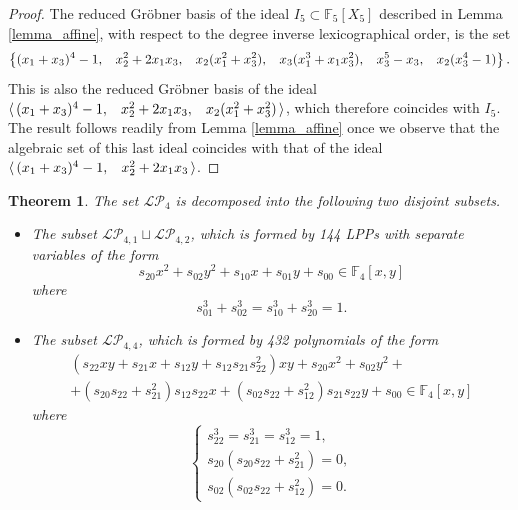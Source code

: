 \documentclass[pdflatex,sn-mathphys-num]{sn-jnl}
\theoremstyle{thmstyleone}%
\newtheorem{theorem}{Theorem}[section]
\begin{document}
\begin{proof} The reduced Gr\"obner basis of the ideal $I_5\subset \mathbb{F}_5[X_5]$ described in Lemma \ref{lemma_affine}, with respect to the degree inverse lexicographical order, is the set
\[\left\{(x_1+x_3)^4-1,\hspace{0.3cm}
x_2^2+2x_1x_3,\hspace{0.3cm}
x_2(x_1^2+x_3^2),\hspace{0.3cm}
x_3(x_1^3+x_1x_3^2),\hspace{0.3cm}
x_3^5-x_3,\hspace{0.3cm}
x_2(x_3^4-1)\right\}.\]
This is also the reduced Gr\"obner basis of the ideal $\langle\, (x_1+x_3)^4-1,\hspace{0.3cm}x_2^2+2x_1x_3,\hspace{0.3cm} x_2(x_1^2+x_3^2)\,\rangle$, which therefore coincides with $I_5$. The result follows readily from Lemma \ref{lemma_affine} once we observe that the algebraic set of this last ideal coincides with that of the ideal $\langle\, (x_1+x_3)^4-1,\hspace{0.3cm}x_2^2+2x_1x_3\,\rangle$.
\end{proof}

\vspace{0.2cm}

\begin{theorem}\label{theorem_LP4} The set $\mathcal{LP}_4$ is decomposed into the following two disjoint subsets.
\begin{itemize}
    \item The subset $\mathcal{LP}_{4,1}\sqcup \mathcal{LP}_{4,2}$, which is formed by 144 LPPs with separate variables of the form
\begin{equation}\label{eq_S1}
s_{20}x^2+s_{02}y^2+s_{10}x+s_{01}y+s_{00}\in\mathbb{F}_4[x,y]
\end{equation}
where
\[s_{01}^3+s_{02}^3 = s_{10}^3+s_{20}^3 =1.\]

\item The subset $\mathcal{LP}_{4,4}$, which is formed by 432 polynomials of the form
\begin{equation}\label{eq_LP4}
\begin{split}
\left(s_{22}xy+s_{21}x+s_{12}y+s_{12}s_{21}s_{22}^2\right)xy+s_{20}x^2+s_{02}y^2+\\ +(s_{20}s_{22}+s_{21}^2)s_{12}s_{22}x+(s_{02}s_{22}+s_{12}^2)s_{21}s_{22}y+s_{00}\in\mathbb{F}_4[x,y]    
\end{split}
\end{equation}
where
\begin{equation}\label{eq_LP4_constraints}
\begin{cases}
s_{22}^3=s_{21}^3=s_{12}^3=1,\\
s_{20}(s_{20}s_{22}+s_{21}^2)=0,\\
s_{02}(s_{02}s_{22}+s_{12}^2)=0.
\end{cases}
\end{equation}
\end{itemize}
\end{theorem}
\end{document}
